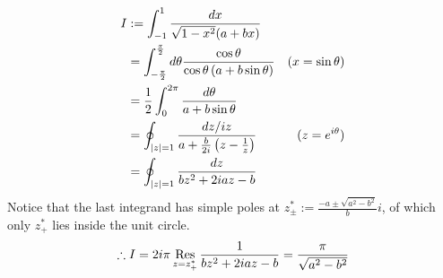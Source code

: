 \item

\begin{align*}
	I
	 & := \int_{-1}^1 \frac{dx}{\sqrt{1 - x^2} (a + bx)}                                                                  \\
	 & = \int_{-\frac{\pi}{2}}^{\frac{\pi}{2}} d\theta \frac{\cos\theta}{\cos\theta \left( a + b\sin\theta \right)} & (x = \sin \theta) \\
	 & = \frac{1}{2} \int_0^{2\pi} \frac{d\theta}{a + b\sin\theta}                                                              \\
	 & = \oint_{\left| z \right| = 1} \frac{dz/iz}{a + \frac{b}{2i}\left( z - \frac{1}{z} \right)}             & (z = e^{i\theta}) \\
	 & = \oint_{\left| z \right| = 1} \frac{dz}{bz^2 + 2iaz - b}
\end{align*}
Notice that the last integrand has simple poles at $z_{\pm}^* := \frac{-a \pm \sqrt{a^2 - b^2}}{b}i$,
of which only $z_+^*$ lies inside the unit circle.
\[
	\therefore I
	= 2i\pi \mathop{\mathrm{Res}}_{z = z_+^*} \frac{1}{bz^2 + 2iaz - b}
	= \frac{\pi}{\sqrt{a^2 - b^2}}
\]